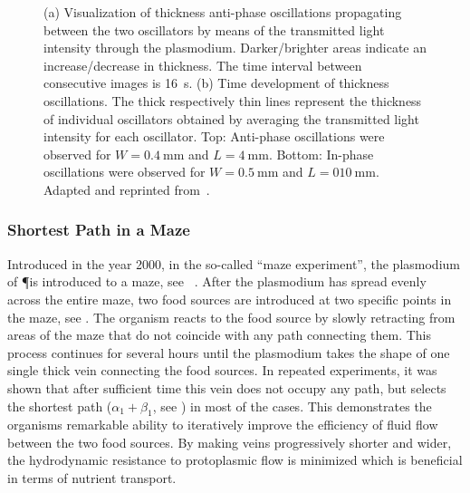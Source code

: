 			\begin{figure}
				\centering
				\newline
	
				\caption[Oscillator experiment - Thickness oscillations]{(a) Visualization of thickness anti-phase oscillations propagating between the two oscillators by means of the transmitted light intensity through the plasmodium. Darker/brighter areas indicate an increase/decrease in thickness. The time interval between consecutive images is \SI{16}{\second}. (b) Time development of thickness oscillations. The thick respectively thin lines represent the thickness of individual oscillators obtained by averaging the transmitted light intensity for each oscillator.
				Top: Anti-phase oscillations were observed for $W=\SI{0.4}{\milli\metre}$ and $L=\SI{4}{\milli\metre}$. Bottom: In-phase oscillations were observed for $W=\SI{0.5}{\milli\metre}$ and $L=\SI{010}{\milli\metre}$. Adapted and reprinted from~\cite{PhysRevLett.85.2026}.}
				\label{fig:oscillator_experiment_thickness}
			\end{figure}{}

			\FloatBarrier

		\subsubsection{Shortest Path in a Maze}

			Introduced in the year 2000, in the so-called ``maze experiment'', the plasmodium of \P is introduced to a maze, see ~\cite{nakagaki2000intelligence}. After the plasmodium has spread evenly across the entire maze, two food sources are introduced at two specific points in the maze, see . The organism reacts to the food source by slowly retracting from areas of the maze that do not coincide with any path connecting them. This process continues for several hours until the plasmodium takes the shape of one single thick vein connecting the food sources. In repeated experiments, it was shown that after sufficient time this vein does not occupy any path, but selects the shortest path ($\alpha_1 + \beta_1$, see ) in most of the cases. This demonstrates the organisms remarkable ability to iteratively improve the efficiency of fluid flow between the two food sources. By making veins progressively shorter and wider, the hydrodynamic resistance to protoplasmic flow is minimized which is beneficial in terms of nutrient transport\cite{kamiya1959motive}. 


